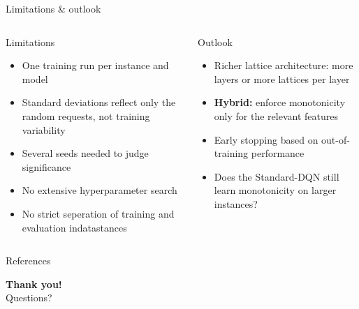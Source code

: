 \documentclass[aspectratio=169, 11pt]{beamer}
\begin{document}
\begin{frame}{Limitations \& outlook}
  \begin{columns}[T]
      \begin{block}{Limitations}
        \begin{itemize}
          \item One training run per instance and model
          \item Standard deviations reflect only the random requests, not training variability
          \item Several seeds needed to judge significance
          \item No extensive hyperparameter search
          \item No strict seperation of training and evaluation indatastances
        \end{itemize}
      \end{block}
      \begin{block}{Outlook}
        \begin{itemize}
          \item Richer lattice architecture: more layers or more lattices per layer
          \item \textbf{Hybrid:} enforce monotonicity only for the relevant features
          \item Early stopping based on out-of-training performance
          \item Does the Standard-DQN still learn monotonicity on larger instances?
        \end{itemize}
      \end{block}
  \end{columns}
\end{frame}

\begin{frame}[allowframebreaks]{References}
  \printbibliography[heading=none]
\end{frame}

\begin{frame}[plain]
  \begin{center}
    {\Huge\textbf{Thank you!}}\\[1em]
    {\large Questions?}
  \end{center}
\end{frame}
\end{document}

